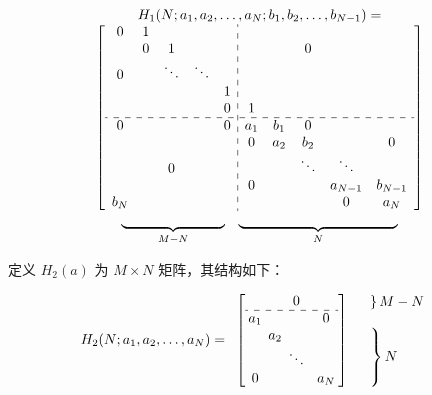 \begin{equation*}	
	\begin{array}{ccccccccccc}
		\setlength{\arraycolsep}{0.8mm}
		H_{1}\!\left(N; a_1, a_2, \dots, a_N ; b_1, b_2, \dots, b_{N-1}\right)=\\
		\left[
		\begin{array}{ccccc:ccccc}
			0&1& & & & & & & & \\
			&0&1& & & & &0& & \\ 
			0& &\ddots&\ddots& & & & & & \\
			& & & &1& & & & & \\
			& & & &0&1& & & & \\ 
			\hdashline
			0& & & &0&a_1&b_1&0& & \\
			& & & & &0&a_2&b_2&&0\\
			& &0& & & & &\ddots&\ddots& \\
			& & & & &0& & &a_{N-1}&b_{N-1}\\
			b_N& & & & & & & &0&a_{N}\\
		\end{array}
		\right] \\

		\begin{array}{cc}
			\underbrace{\rule{26mm}{0mm}}_{M-N}&  
			\underbrace{\rule{40mm}{0mm}}_{N}
		\end{array}
	\end{array}
\end{equation*}

定义 $H_{2}(a)$ 为 $M \times N$ 矩阵，其结构如下：

\begin{equation*}
	H_{2}\!\left(N; a_1, a_2, \dots, a_N\right)=
	\begin{array}{cccccc}
		\setlength{\arraycolsep}{0.8mm}
		\left[
		\begin{array}{ccccc}
			& &0& & \\
			\hdashline
			a_1& & & &0\\ 
			&a_2& & & \\
			& &\ddots& & \\
			0& & & &a_N\\
		\end{array}
		\right]
		&  
		\begin{array}{cc}
			\left.\rule{0mm}{2mm}\right\}M-N \\ \hfill
			\\
			\left.\rule{0mm}{8mm}\right\}N \hfill
		\end{array}
	\end{array}
\end{equation*}

